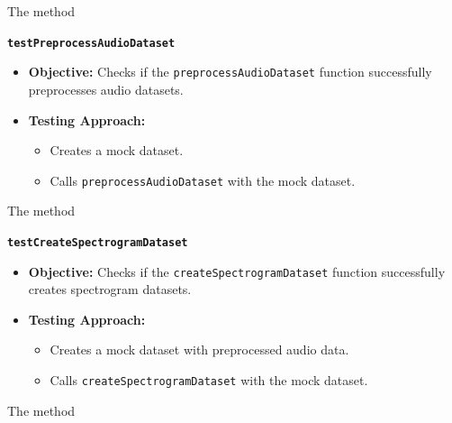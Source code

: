 \begin{code}[h!]
	
	
	\caption{The  method}
	\label{code:testLoadDataset}
\end{code}

\textbf{\texttt{testPreprocessAudioDataset}}

\begin{itemize}
	\item \textbf{Objective:} Checks if the \texttt{preprocessAudioDataset} function successfully preprocesses audio datasets.
	\item \textbf{Testing Approach:}
	\begin{itemize}
		\item Creates a mock dataset.
		\item Calls \texttt{preprocessAudioDataset} with the mock dataset.
	\end{itemize}
\end{itemize}

\begin{code}[h!]
	
	
	\caption{The  method}
	\label{code:testPreprocessAudioDataset}
\end{code}

\textbf{\texttt{testCreateSpectrogramDataset}}

\begin{itemize}
	\item \textbf{Objective:} Checks if the \texttt{createSpectrogramDataset} function successfully creates spectrogram datasets.
	\item \textbf{Testing Approach:}
	\begin{itemize}
		\item Creates a mock dataset with preprocessed audio data.
		\item Calls \texttt{createSpectrogramDataset} with the mock dataset.
	\end{itemize}
\end{itemize}

\begin{code}[h!]
	
	
	\caption{The  method}
	\label{code:testCreateSpectrogramDataset}
\end{code}


